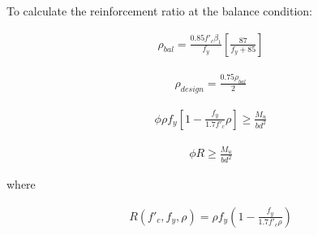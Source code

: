 To calculate the reinforcement ratio at the balance condition:

\begin{align}
	\rho_{bal} = 
	\frac{0.85f'_c\beta_1}{f_y}
	\left[
		\frac{87}{f_y+85}
	\right]
\end{align}

\begin{align}
	\rho_{design}=\frac{0.75\rho_{bal}}{2}
\end{align}



\begin{align}
	\phi \rho f_y
	\left[1-\frac{f_y}{1.7 f'_c} \rho\right]
	\geq
	\frac{M_u}{bd^2}
\end{align}

\begin{align}
	\phi R \geq \frac{M_u}{bd^2}
\end{align}

where

\begin{align}
	R(f'_c,f_y,\rho) = 
	\rho f_y 
	\left(1-\frac{f_y}{1.7f'_c \rho}\right)
\end{align}





